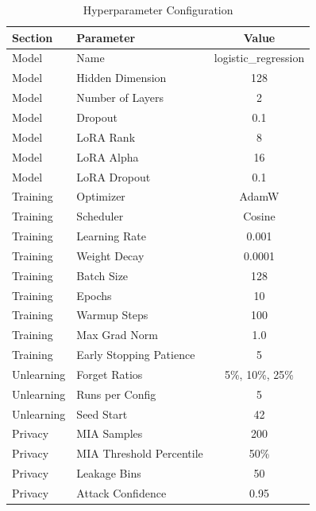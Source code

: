 \begin{table}[t]
\centering
\caption{Hyperparameter Configuration}
\label{tab:hyperparameters}
\small
\begin{tabular}{l l c}
\toprule
Section & Parameter & Value \\
\midrule
Model & Name & logistic_regression \\
Model & Hidden Dimension & 128 \\
Model & Number of Layers & 2 \\
Model & Dropout & 0.1 \\
Model & LoRA Rank & 8 \\
Model & LoRA Alpha & 16 \\
Model & LoRA Dropout & 0.1 \\
Training & Optimizer & AdamW \\
Training & Scheduler & Cosine \\
Training & Learning Rate & 0.001 \\
Training & Weight Decay & 0.0001 \\
Training & Batch Size & 128 \\
Training & Epochs & 10 \\
Training & Warmup Steps & 100 \\
Training & Max Grad Norm & 1.0 \\
Training & Early Stopping Patience & 5 \\
Unlearning & Forget Ratios & 5\%, 10\%, 25\% \\
Unlearning & Runs per Config & 5 \\
Unlearning & Seed Start & 42 \\
Privacy & MIA Samples & 200 \\
Privacy & MIA Threshold Percentile & 50\% \\
Privacy & Leakage Bins & 50 \\
Privacy & Attack Confidence & 0.95 \\
\bottomrule
\end{tabular}
\end{table}
